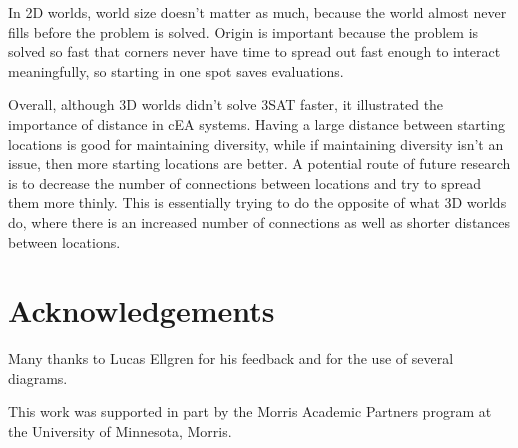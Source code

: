 \documentclass[12pt]{article}
\begin{document}
In 2D worlds, world size doesn't matter as much, because the world almost never fills before the problem is solved. Origin is important because the problem is solved so fast that corners never have time to spread out fast enough to interact meaningfully, so starting in one spot saves evaluations.       

Overall, although 3D worlds didn't solve 3SAT faster, it illustrated the importance of distance in cEA systems. Having a large distance between starting locations is good for maintaining diversity, while if maintaining diversity isn't an issue, then more starting locations are better. A potential route of future research is to decrease the number of connections between locations and try to spread them more thinly. This is essentially trying to do the opposite of what 3D worlds do, where there is an increased number of connections as well as shorter distances between locations.

\section*{Acknowledgements}

Many thanks to Lucas Ellgren for his feedback and for the use of several diagrams.

This work was supported in part by the Morris Academic Partners program at the University of Minnesota, Morris.



\end{document}
